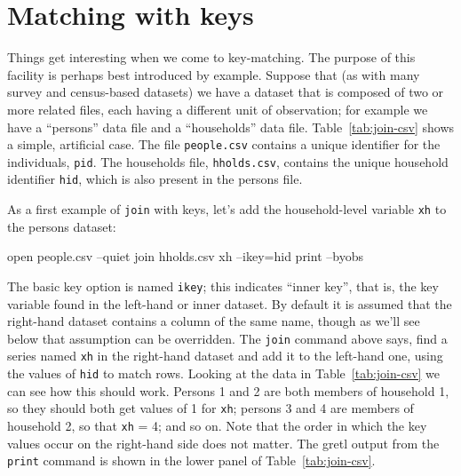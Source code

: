 \section{Matching with keys}
\label{sec:join-keys}

Things get interesting when we come to key-matching. The purpose of
this facility is perhaps best introduced by example.  Suppose that (as
with many survey and census-based datasets) we have a dataset that is
composed of two or more related files, each having a different unit of
observation; for example we have a ``persons'' data file and a
``households'' data file. Table~\ref{tab:join-csv} shows a simple,
artificial case. The file \texttt{people.csv} contains a unique
identifier for the individuals, \texttt{pid}. The households file,
\texttt{hholds.csv}, contains the unique household identifier
\texttt{hid}, which is also present in the persons file.

As a first example of \texttt{join} with keys, let's add the
household-level variable \texttt{xh} to the persons dataset:
%
\begin{code}
open people.csv --quiet
join hholds.csv xh --ikey=hid
print --byobs
\end{code}

The basic key option is named \texttt{ikey}; this indicates ``inner
key'', that is, the key variable found in the left-hand or inner
dataset. By default it is assumed that the right-hand dataset contains
a column of the same name, though as we'll see below that assumption
can be overridden. The \texttt{join} command above says, find a series
named \texttt{xh} in the right-hand dataset and add it to the
left-hand one, using the values of \texttt{hid} to match rows.
Looking at the data in Table~\ref{tab:join-csv} we can see how this
should work. Persons 1 and 2 are both members of household 1, so they
should both get values of 1 for \texttt{xh}; persons 3 and 4 are
members of household 2, so that \texttt{xh} = 4; and so on. Note that
the order in which the key values occur on the right-hand side does
not matter.  The gretl output from the \texttt{print} command is shown
in the lower panel of Table~\ref{tab:join-csv}.

